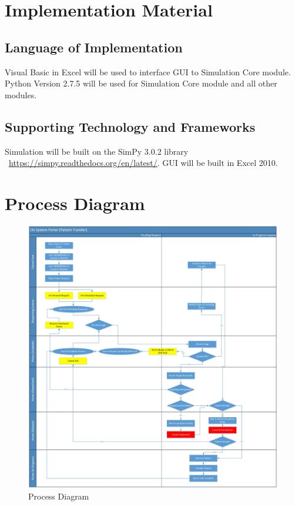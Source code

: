 \documentclass[paper=letter, fontsize=10pt]{scrartcl}
\numberwithin{equation}{section}		%
\numberwithin{figure}{section}			%
\numberwithin{table}{section}				%
\begin{document}
\section{Implementation Material}
\subsection{Language of Implementation}
Visual Basic in Excel will be used to interface GUI to Simulation Core module. Python Version 2.7.5 will be used for Simulation Core module and all other modules.
\subsection{Supporting Technology and Frameworks}
Simulation will be built on the SimPy 3.0.2 library \newline \ \underline{\url{https://simpy.readthedocs.org/en/latest/}}. GUI will be built in Excel 2010. 

\section{Process Diagram}
\begin{figure}[H]
	\begin{center}
		\includegraphics[width=1\textwidth, height=0.8\textheight, keepaspectratio]{../Process_Diagrams/Process_Diagram.jpg}
		\caption{Process Diagram}
	\end{center}
\end{figure}
\end{document}
